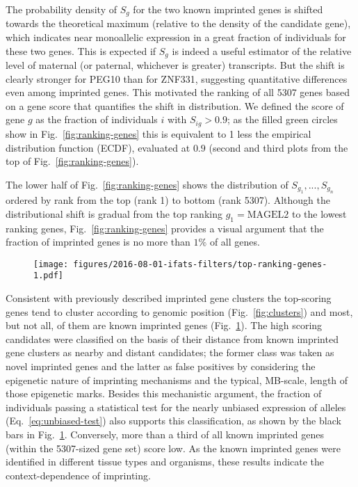 \documentclass[letterpaper]{article}
\begin{document}
The probability density of \(S_g\) for the two known imprinted
genes is shifted towards the theoretical maximum (relative to the density of
the candidate gene), which indicates near monoallelic expression in a great
fraction of individuals for these two genes.  This is expected if \(S_g\) is
indeed a useful estimator of the relative level of maternal (or paternal,
whichever is greater) transcripts.  But the shift is clearly
stronger for PEG10 than for ZNF331, suggesting quantitative differences even
among imprinted genes.  This motivated the ranking of all 5307 genes
based on a gene score that quantifies the shift in distribution.  We defined the score of
gene \(g\) as the fraction of individuals \(i\) with \(S_{ig}>0.9\); as the filled green
circles show in Fig.~\ref{fig:ranking-genes} this is equivalent to 1 less the
empirical distribution function (ECDF), evaluated at \(0.9\) (second and
third plots from the top of Fig.~\ref{fig:ranking-genes}).

The lower half of Fig.~\ref{fig:ranking-genes} shows the distribution of
\(S_{g_1},...,S_{g_{n}}\) ordered by rank from the top (rank 1) to bottom
(rank 5307).  Although the distributional shift is gradual from the top ranking
\(g_1=\mathrm{MAGEL2}\) to the lowest ranking genes,
Fig.~\ref{fig:ranking-genes} provides a visual argument that the fraction of
imprinted genes is no more than \(1\%\) of all genes.

\begin{figure}
\begin{center}
\texttt{[image: figures/2016-08-01-ifats-filters/top-ranking-genes-1.pdf]}
\caption{}
\label{fig:top-genes}
\end{center}
\end{figure}

Consistent with previously described imprinted gene clusters the top-scoring
genes tend to cluster according to genomic position (Fig.~\ref{fig:clusters})
and most, but not all, of them are known imprinted genes
(Fig.~\ref{fig:top-genes}).  The high scoring candidates were classified on
the basis of their distance from known imprinted gene clusters as nearby and
distant candidates; the former class was taken as novel imprinted genes and
the latter as false positives by considering the epigenetic nature of
imprinting mechanisms and the typical, MB-scale, length of those epigenetic
marks.  Besides this mechanistic argument, the fraction of individuals passing
a statistical test for the nearly unbiased expression of alleles
(Eq.~\ref{eq:unbiased-test}) also supports this classification, as shown by
the black bars in Fig.~\ref{fig:top-genes}. Conversely, more than a third of
all known imprinted genes (within the 5307-sized gene set) score low.  As the
known imprinted genes were identified in different tissue types and organisms,
these results indicate the context-dependence of imprinting.
\end{document}
